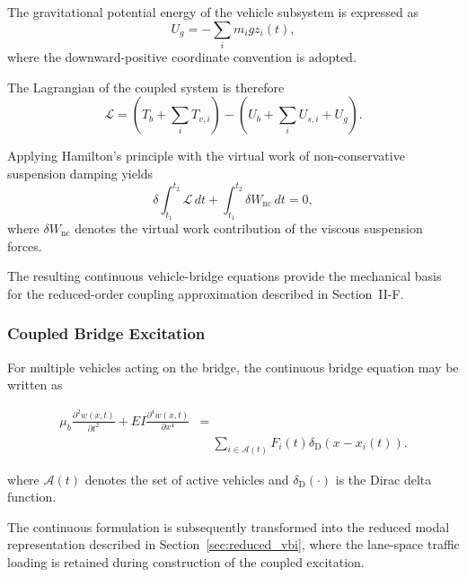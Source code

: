 \documentclass[journal]{IEEEtran}
\begin{document}
The gravitational potential energy of the vehicle
subsystem is expressed as
\begin{equation}
U_g=-\sum_i m_i g z_i(t),
\end{equation}
where the downward-positive coordinate convention
is adopted.

The Lagrangian of the coupled system is therefore
\begin{equation}
\mathcal{L}
=
\left(T_b+\sum_i T_{v,i}\right)
-
\left(U_b+\sum_i U_{s,i}+U_g\right).
\label{eq:coupled_lagrangian}
\end{equation}

Applying Hamilton's principle with the virtual
work of non-conservative suspension damping yields
\begin{equation}
\delta\int_{t_1}^{t_2}\mathcal{L}\,dt
+
\int_{t_1}^{t_2}\delta W_{\mathrm{nc}}\,dt
=0,
\label{eq:hamilton_vbi}
\end{equation}
where $\delta W_{\mathrm{nc}}$ denotes the
virtual work contribution of the viscous
suspension forces.

The resulting continuous vehicle-bridge equations
provide the mechanical basis for the reduced-order
coupling approximation described in Section~II-F.




\subsubsection{Coupled Bridge Excitation}

For multiple vehicles acting on the bridge, the continuous bridge
equation may be written as

\begin{equation}
\begin{aligned}
\mu_b
\frac{\partial^2 w(x,t)}{\partial t^2}
+
EI
\frac{\partial^4 w(x,t)}{\partial x^4}
&=
\\[-0.2em]
&\quad
\sum_{i\in\mathcal{A}(t)}
F_i(t)
\delta_{\mathrm{D}}
\left(
x-x_i(t)
\right).
\end{aligned}
\end{equation}

where $\mathcal{A}(t)$ denotes the set of active vehicles and $\delta_{\mathrm{D}}(\cdot)$ is the Dirac delta function.

The continuous formulation is subsequently transformed into the reduced
modal representation described in Section~\ref{sec:reduced_vbi}, where the lane-space traffic
loading is retained during construction of the coupled excitation.
\end{document}
